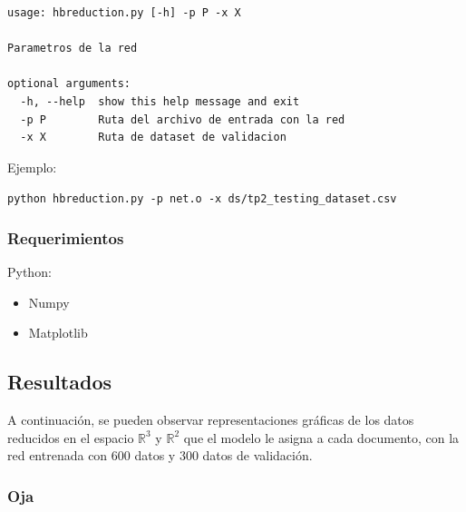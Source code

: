 \begin{lstlisting}[style=bash]
usage: hbreduction.py [-h] -p P -x X

Parametros de la red

optional arguments:
  -h, --help  show this help message and exit
  -p P        Ruta del archivo de entrada con la red
  -x X        Ruta de dataset de validacion
\end{lstlisting}

Ejemplo:

\noindent\texttt{python hbreduction.py -p net.o -x ds/tp2\_testing\_dataset.csv} 

\subsubsection{Requerimientos}

Python:
\begin{itemize}
\item Numpy 
\item Matplotlib
\end{itemize}

\subsection{Resultados}

A continuación, se pueden observar representaciones gráficas de los datos reducidos en el espacio $\mathbb{R}^3$ y $\mathbb{R}^2$ que el modelo le asigna a cada documento, con la red entrenada con 600 datos y 300 datos de validación.

\subsubsection{Oja}

